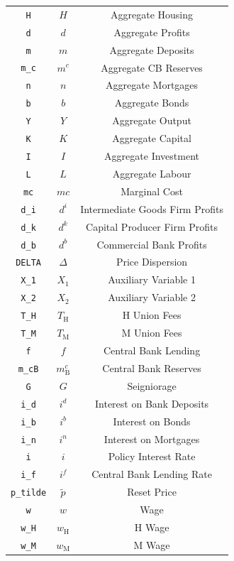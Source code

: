\begin{center}
\begin{longtable}{ccc}
\texttt{H} & $H$ & Aggregate Housing\\
\texttt{d} & $d$ & Aggregate Profits\\
\texttt{m} & $m$ & Aggregate Deposits\\
\texttt{m\_c} & $m^c$ & Aggregate CB Reserves\\
\texttt{n} & $n$ & Aggregate Mortgages\\
\texttt{b} & $b$ & Aggregate Bonds\\
\texttt{Y} & $Y$ & Aggregate Output\\
\texttt{K} & $K$ & Aggregate Capital\\
\texttt{I} & $I$ & Aggregate Investment\\
\texttt{L} & $L$ & Aggregate Labour\\
\texttt{mc} & $mc$ & Marginal Cost\\
\texttt{d\_i} & $d^i$ & Intermediate Goods Firm Profits\\
\texttt{d\_k} & $d^k$ & Capital Producer Firm Profits\\
\texttt{d\_b} & $d^b$ & Commercial Bank Profits\\
\texttt{DELTA} & $\Delta$ & Price Dispersion\\
\texttt{X\_1} & $X_1$ & Auxiliary Variable 1\\
\texttt{X\_2} & $X_2$ & Auxiliary Variable 2\\
\texttt{T\_H} & $T_\mathrm{H}$ & H Union Fees\\
\texttt{T\_M} & $T_\mathrm{M}$ & M Union Fees\\
\texttt{f} & $f$ & Central Bank Lending\\
\texttt{m\_cB} & $m^c_\mathrm{B}$ & Central Bank Reserves\\
\texttt{G} & $G$ & Seigniorage\\
\texttt{i\_d} & $i^d$ & Interest on Bank Deposits\\
\texttt{i\_b} & $i^b$ & Interest on Bonds\\
\texttt{i\_n} & $i^n$ & Interest on Mortgages\\
\texttt{i} & $i$ & Policy Interest Rate\\
\texttt{i\_f} & $i^f$ & Central Bank Lending Rate\\
\texttt{p\_tilde} & $\tilde{p}$ & Reset Price\\
\texttt{w} & $w$ & Wage\\
\texttt{w\_H} & $w_\mathrm{H}$ & H Wage\\
\texttt{w\_M} & $w_\mathrm{M}$ & M Wage\\

\end{longtable}
\end{center}
